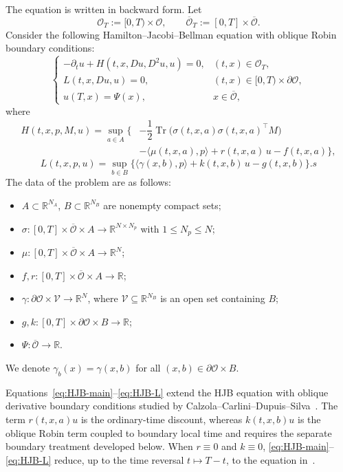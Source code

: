 \documentclass[11pt]{article}
\theoremstyle{definition}
\theoremstyle{remark}
\newcommand{\R}{\mathbb{R}}
\newcommand{\cO}{\mathcal{O}}
\newcommand{\Tr}{\operatorname{Tr}}
\begin{document}
	The equation is written in backward form.  Let
	\[
	\cO_T:=[0,T)\times\cO,\qquad \overline{\cO}_T:=[0,T]\times\overline{\cO}.
	\]
	Consider the following Hamilton--Jacobi--Bellman equation with oblique Robin boundary conditions:
	\begin{equation}
		\begin{cases}
			-\partial_t u + H(t,x,Du,D^2u,u) = 0, & (t,x)\in\cO_T, \\[8pt]
			L(t,x,Du,u) = 0, & (t,x)\in[0,T)\times\partial\cO, \\[8pt]
			u(T,x) = \Psi(x), & x\in\overline{\cO},
		\end{cases}
		\label{eq:HJB-main}
	\end{equation}
	where
	\begin{equation}
		\label{eq:HJB-H}
		\begin{aligned}
			H(t,x,p,M,u) = \sup_{a\in A}\Big\{
			&-\dfrac{1}{2}\Tr\big(\sigma(t,x,a)\sigma(t,x,a)^{\top}M\big) \\
			&-\langle\mu(t,x,a),p\rangle
			+ r(t,x,a)\,u - f(t,x,a) \Big\},
		\end{aligned}
	\end{equation}
	\begin{equation}
		\label{eq:HJB-L}
		L(t,x,p,u) = \sup_{b\in B}\Big\{
		\langle\gamma(x,b),p\rangle + k(t,x,b)\,u - g(t,x,b) \Big\}.
 s	\end{equation}
	The data of the problem are as follows:
	\begin{itemize}
		\item $A\subset\R^{N_A}$, $B\subset\R^{N_B}$ are nonempty compact sets;
		\item $\sigma:[0,T]\times\overline{\cO}\times A\to\R^{N\times N_p}$ with $1\le N_p\le N$;
		\item $\mu:[0,T]\times\overline{\cO}\times A\to\R^N$;
		\item $f,r:[0,T]\times\overline{\cO}\times A\to\R$;
		\item $\gamma:\partial\cO\times\mathcal{V}\to\R^N$, where $\mathcal{V}\subseteq\R^{N_B}$ is an open set containing $B$;
		\item $g,k:[0,T]\times\partial\cO\times B\to\R$;
		\item $\Psi:\overline{\cO}\to\R$.
	\end{itemize}
	We denote $\gamma_b(x)=\gamma(x,b)$ for all $(x,b)\in\partial\cO\times B$.
	
	Equations~\eqref{eq:HJB-main}--\eqref{eq:HJB-L} extend the HJB equation with oblique derivative boundary conditions studied by Calzola--Carlini--Dupuis--Silva~\cite{CalzolaEtAl2023}.  The term $r(t,x,a)u$ is the ordinary-time discount, whereas $k(t,x,b)u$ is the oblique Robin term coupled to boundary local time and requires the separate boundary treatment developed below.  When $r\equiv0$ and $k\equiv0$, \eqref{eq:HJB-main}--\eqref{eq:HJB-L} reduce, up to the time reversal $t\mapsto T-t$, to the equation in~\cite{CalzolaEtAl2023}.
	
\end{document}
